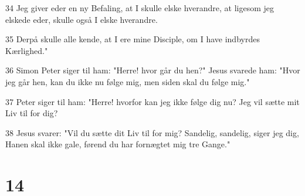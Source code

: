 \par 34 Jeg giver eder en ny Befaling, at I skulle elske hverandre, at ligesom jeg elskede eder, skulle også I elske hverandre.
\par 35 Derpå skulle alle kende, at I ere mine Disciple, om I have indbyrdes Kærlighed."
\par 36 Simon Peter siger til ham: "Herre! hvor går du hen?" Jesus svarede ham: "Hvor jeg går hen, kan du ikke nu følge mig, men siden skal du følge mig."
\par 37 Peter siger til ham: "Herre! hvorfor kan jeg ikke følge dig nu? Jeg vil sætte mit Liv til for dig?
\par 38 Jesus svarer: "Vil du sætte dit Liv til for mig? Sandelig, sandelig, siger jeg dig, Hanen skal ikke gale, førend du har fornægtet mig tre Gange."

\chapter{14}

